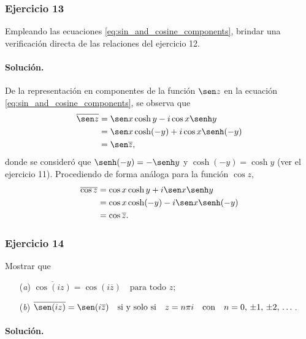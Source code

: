 \documentclass[a4paper]{report}
\begin{document}
\subsubsection{Ejercicio 13}

Empleando las ecuaciones \ref{eq:sin_and_cosine_components}, brindar una verificación directa de las relaciones del ejercicio 12.

\paragraph{Solución.} De la representación en componentes de la función \(\sen z\) en la ecuación \ref{eq:sin_and_cosine_components}, se observa que 
\begin{align*}
 \overline{\sen z}&=\sen x\cosh y-i\cos x\senh y\\
   &=\sen x\cosh(-y)+i\cos x\senh(-y)\\
   &=\sen\overline{z},
\end{align*}
donde se consideró que \(\senh(-y)=-\senh y\) y \(\cosh(-y)=\cosh y\) (ver el ejercicio 11). Procediendo de forma análoga para la función \(\cos z\),
\begin{align*}
 \overline{\cos z}&=\cos x\cosh y+i\sen x\senh y\\
   &=\cos x\cosh(-y)-i\sen x\senh(-y)\\
   &=\cos\overline{z}.
\end{align*}

\subsubsection{Ejercicio 14}

Mostrar que 
\begin{enumerate}
 \item[(\textit{a})] \(\displaystyle\overline{\cos(iz)}=\cos(i\overline{z})\quad\textrm{para todo }z;\)
 \item[(\textit{b})] \(\displaystyle\overline{\sen(iz)}=\sen(i\overline{z})\quad\textrm{si y solo si}\quad z=n\pi i\quad\textrm{con}\quad n=0,\,\pm1,\,\pm2,\,\dots\).
\end{enumerate} 

\paragraph{Solución.}
\end{document}
